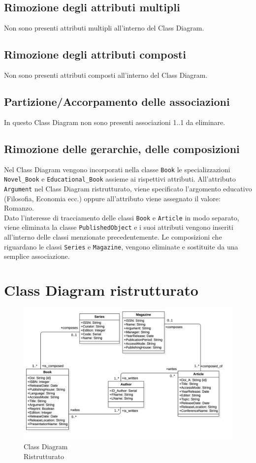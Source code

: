 \subsection{Rimozione degli attributi multipli}
Non sono presenti attributi multipli all'interno del Class Diagram.
\subsection{Rimozione degli attributi composti}
Non sono presenti attributi composti all'interno del Class Diagram.

\subsection{Partizione/Accorpamento delle associazioni}
In questo Class Diagram non sono presenti associazioni 1..1 da eliminare.
\subsection{Rimozione delle gerarchie, delle composizioni}
Nel Class Diagram vengono incorporati nella classe \texttt{Book} le specializzazioni \texttt{Novel\_Book} e \texttt{Educational\_Book} assieme ai rispettivi attributi. All'attributo \texttt{Argument} nel Class Diagram ristrutturato, viene specificato l'argomento educativo (Filosofia, Economia ecc.) oppure all'attributo viene assegnato il valore: Romanzo.\\
Dato l'interesse di tracciamento delle classi \texttt{Book} e \texttt{Article} in modo separato, viene eliminata la classe \texttt{PublishedObject} e i suoi attributi vengono inseriti all'interno delle classi menzionate precedentemente.
Le composizioni che riguardano le classi \texttt{Series} e \texttt{Magazine}, vengono eliminate e sostituite da una semplice associazione.
\newpage
\section{Class Diagram ristrutturato}

\begin{figure}[hbt]
\centering
\includegraphics[width=1\textwidth]{Immagini/ClassDiagramRIS.png}
\caption{Class Diagram \\ Ristrutturato}
\label{fig:ClassDiagramRIS}
\end{figure}

